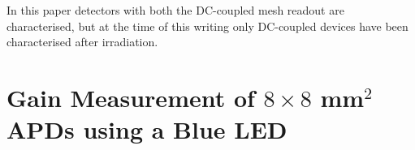 \documentclass{article}
\begin{document}
In this paper detectors with both the DC-coupled mesh readout are characterised, but at the time of this writing only DC-coupled devices have been characterised after irradiation. 





\section{Gain Measurement of $8 \times 8$ mm$^2$ APDs using a Blue LED}
\label{sec:gain8x8led}
\end{document}
